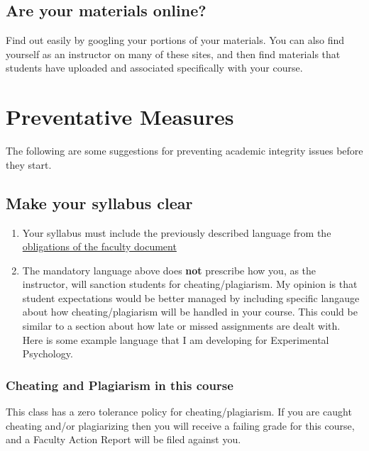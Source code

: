 \documentclass[]{book}
\theoremstyle{definition}
\theoremstyle{definition}
\theoremstyle{definition}
\theoremstyle{remark}
\begin{document}
\section{Are your materials online?}\label{are-your-materials-online}

Find out easily by googling your portions of your materials. You can
also find yourself as an instructor on many of these sites, and then
find materials that students have uploaded and associated specifically
with your course.

\chapter{Preventative Measures}\label{preventative-measures}

The following are some suggestions for preventing academic integrity
issues before they start.

\section{Make your syllabus clear}\label{make-your-syllabus-clear}

\begin{enumerate}
\def\labelenumi{\arabic{enumi}.}
\item
  Your syllabus must include the previously described language from the
  \href{\%22Resources/F16_FacultyObligations_andSyllabus.pdf\%22}{obligations
  of the faculty document}
\item
  The mandatory language above does \textbf{not} prescribe how you, as
  the instructor, will sanction students for cheating/plagiarism. My
  opinion is that student expectations would be better managed by
  including specific langauge about how cheating/plagiarism will be
  handled in your course. This could be similar to a section about how
  late or missed assignments are dealt with. Here is some example
  language that I am developing for Experimental Psychology.
\end{enumerate}

\subsection{Cheating and Plagiarism in this
course}\label{cheating-and-plagiarism-in-this-course}

This class has a zero tolerance policy for cheating/plagiarism. If you
are caught cheating and/or plagiarizing then you will receive a failing
grade for this course, and a Faculty Action Report will be filed against
you.
\end{document}

